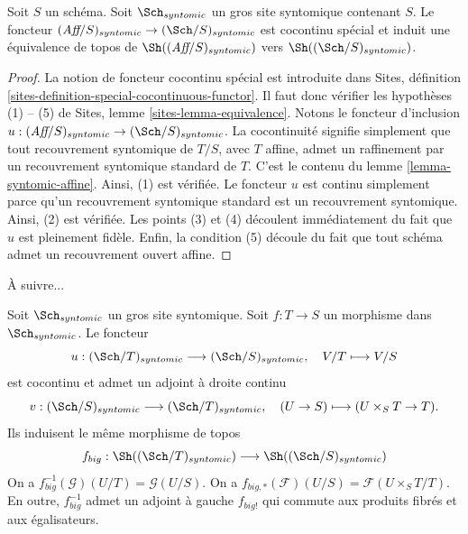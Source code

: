 \begin{lemma}
\label{lemma-affine-big-site-syntomic}
Soit $S$ un schéma. Soit $\Sch_{syntomic}$ un gros site
syntomique contenant $S$.
Le foncteur
$(\textit{Aff}/S)_{syntomic} \to (\Sch/S)_{syntomic}$
est cocontinu spécial et induit une équivalence de topos de
$\Sh((\textit{Aff}/S)_{syntomic})$ vers
$\Sh((\Sch/S)_{syntomic})$.
\end{lemma}

\begin{proof}
La notion de foncteur cocontinu spécial est introduite dans
Sites, définition \ref{sites-definition-special-cocontinuous-functor}.
Il faut donc vérifier les hypothèses (1) -- (5) de
Sites, lemme \ref{sites-lemma-equivalence}.
Notons le foncteur d'inclusion
$u : (\textit{Aff}/S)_{syntomic} \to (\Sch/S)_{syntomic}$.
La cocontinuité signifie simplement que tout recouvrement syntomique de
$T/S$, avec $T$ affine, admet un raffinement par un recouvrement syntomique standard de $T$.
C'est le contenu du
lemme \ref{lemma-syntomic-affine}.
Ainsi, (1) est vérifiée. Le foncteur $u$ est continu simplement parce qu'un recouvrement
syntomique standard est un recouvrement syntomique. Ainsi, (2) est vérifiée.
Les points (3) et (4) découlent immédiatement du fait que $u$ est
pleinement fidèle. Enfin, la condition (5) découle du
fait que tout schéma admet un recouvrement ouvert affine.
\end{proof}

\noindent
À suivre...

\begin{lemma}
\label{lemma-morphism-big-syntomic}
Soit $\Sch_{syntomic}$ un gros site syntomique.
Soit $f : T \to S$ un morphisme dans $\Sch_{syntomic}$.
Le foncteur
$$
u : (\Sch/T)_{syntomic} \longrightarrow (\Sch/S)_{syntomic},
\quad
V/T \longmapsto V/S
$$
est cocontinu et admet un adjoint à droite continu
$$
v : (\Sch/S)_{syntomic} \longrightarrow (\Sch/T)_{syntomic},
\quad
(U \to S) \longmapsto (U \times_S T \to T).
$$
Ils induisent le même morphisme de topos
$$
f_{big} :
\Sh((\Sch/T)_{syntomic})
\longrightarrow
\Sh((\Sch/S)_{syntomic})
$$
On a $f_{big}^{-1}(\mathcal{G})(U/T) = \mathcal{G}(U/S)$.
On a $f_{big, *}(\mathcal{F})(U/S) = \mathcal{F}(U \times_S T/T)$.
En outre, $f_{big}^{-1}$ admet un adjoint à gauche $f_{big!}$ qui commute aux
produits fibrés et aux égalisateurs.
\end{lemma}

